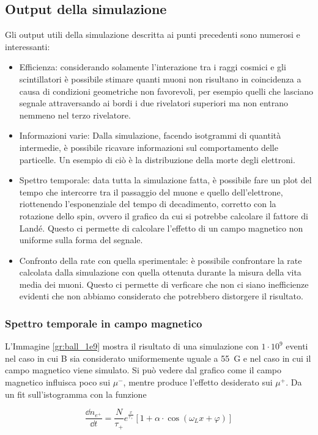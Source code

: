 \subsection{Output della simulazione}
Gli output utili della simulazione descritta ai punti precedenti sono numerosi e interessanti:
\begin{itemize}
\item Efficienza: considerando solamente l'interazione tra i raggi cosmici e gli scintillatori è possibile stimare quanti muoni non risultano in coincidenza a causa
di condizioni geometriche non favorevoli, per esempio quelli che lasciano segnale attraversando ai bordi i due rivelatori superiori ma non entrano nemmeno nel terzo
rivelatore.
\item Informazioni varie: Dalla simulazione, facendo isotgrammi di quantit\`a intermedie, \`e possibile ricavare informazioni sul comportamento delle particelle. Un esempio di ci\`o \`e la distribuzione della morte degli elettroni.
\item Spettro temporale: data tutta la simulazione fatta, è possibile fare un plot del tempo che intercorre tra il passaggio del muone e quello dell'elettrone, riottenendo
l'esponenziale del tempo di decadimento, corretto con la rotazione dello spin, ovvero il grafico da cui si potrebbe calcolare il fattore di Land\'e. Questo ci permette di calcolare l'effetto di un campo magnetico non uniforme sulla forma del segnale.
\item Confronto della rate con quella sperimentale: \`e possibile confrontare la rate calcolata dalla simulazione con quella ottenuta durante la misura della vita media dei muoni. Questo ci permette di verficare che non ci siano inefficienze evidenti che non abbiamo considerato che potrebbero distorgere il risultato.
\end{itemize}

\subsubsection{Spettro temporale in campo magnetico}
L'Immagine \ref{gr:ball_1e9} mostra il risultato di una simulazione con $1\cdot 10^9$ eventi nel caso in cui B sia considerato uniformemente uguale a 55~G e nel caso in cui il campo magnetico viene simulato. 
Si pu\`o vedere dal grafico come il campo magnetico influisca poco sui $\mu^-$, mentre produce l'effetto desiderato sui $\mu^+$. 
Da un fit sull'istogramma con la funzione

\begin{equation}
	\frac{\dd n_{e^+}}{\dd t} = \frac{N}{\tau_+}e^{\frac{x}{\tau_+}}\left[1 + \alpha\cdot\cos(\omega_L x + \varphi)\right]
	\label{eq:sim_fit}
\end{equation}

